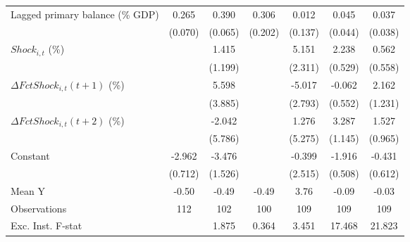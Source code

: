 {\begin{tabular}{l*{6}{c}}
\addlinespace
Lagged primary balance (\% GDP)&       0.265\sym{***}&       0.390\sym{***}&       0.306         &       0.012         &       0.045         &       0.037         \\
                    &     (0.070)         &     (0.065)         &     (0.202)         &     (0.137)         &     (0.044)         &     (0.038)         \\
\addlinespace
$ Shock_{i,t}$ (\%) &                     &       1.415         &                     &       5.151\sym{**} &       2.238\sym{***}&       0.562         \\
                    &                     &     (1.199)         &                     &     (2.311)         &     (0.529)         &     (0.558)         \\
\addlinespace
$ \Delta FctShock_{i,t}(t+1)$ (\%)&                     &       5.598         &                     &      -5.017\sym{*}  &      -0.062         &       2.162         \\
                    &                     &     (3.885)         &                     &     (2.793)         &     (0.552)         &     (1.231)         \\
\addlinespace
$ \Delta FctShock_{i,t}(t+2)$ (\%)&                     &      -2.042         &                     &       1.276         &       3.287\sym{**} &       1.527         \\
                    &                     &     (5.786)         &                     &     (5.275)         &     (1.145)         &     (0.965)         \\
\addlinespace
Constant            &      -2.962\sym{***}&      -3.476\sym{**} &                     &      -0.399         &      -1.916\sym{***}&      -0.431         \\
                    &     (0.712)         &     (1.526)         &                     &     (2.515)         &     (0.508)         &     (0.612)         \\
\midrule
Mean Y              &       -0.50         &       -0.49         &       -0.49         &        3.76         &       -0.09         &       -0.03         \\
Observations        &         112         &         102         &         100         &         109         &         109         &         109         \\
Exc. Inst. F-stat   &                     &       1.875         &       0.364         &       3.451         &      17.468         &      21.823         \\
\bottomrule
\end{tabular}
}
